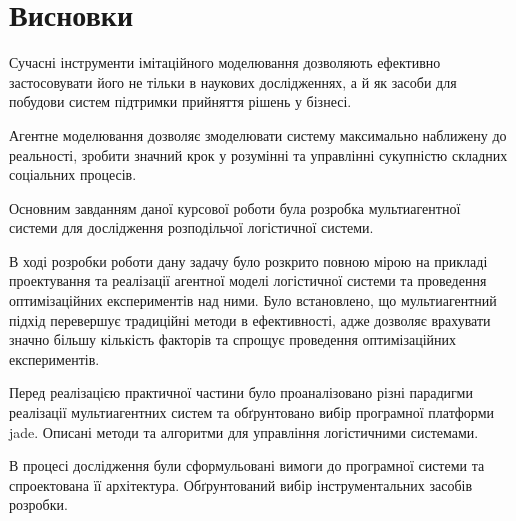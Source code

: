 \section*{Висновки}
Сучасні інструменти імітаційного моделювання дозволяють ефективно застосовувати його
не тільки в наукових дослідженнях, а й як засоби для побудови систем підтримки прийняття рішень у бізнесі. 

Агентне моделювання дозволяє змоделювати систему максимально наближену до реальності, зробити значний крок у розумінні та управлінні сукупністю складних соціальних процесів.

Основним завданням даної курсової роботи була розробка  мультиагентної системи для дослідження розподільчої логістичної системи.

В ході розробки роботи дану задачу було розкрито повною мірою на прикладі проектування та реалізації агентної моделі логістичної системи та проведення оптимізаційних експериментів над ними. 
Було встановлено, що мультиагентний підхід перевершує традиційні методи в ефективності, адже дозволяє врахувати значно більшу кількість факторів та спрощує проведення оптимізаційних експериментів.

Перед реалізацією практичної частини було проаналізовано різні парадигми реалізації мультиагентних систем та обґрунтовано вибір програмної платформи \acrshort{jade}.
Описані методи та алгоритми для управління логістичними системами. 

В процесі дослідження були сформульовані вимоги до програмної системи та спроектована її архітектура. 
Обґрунтований вибір інструментальних засобів розробки.
